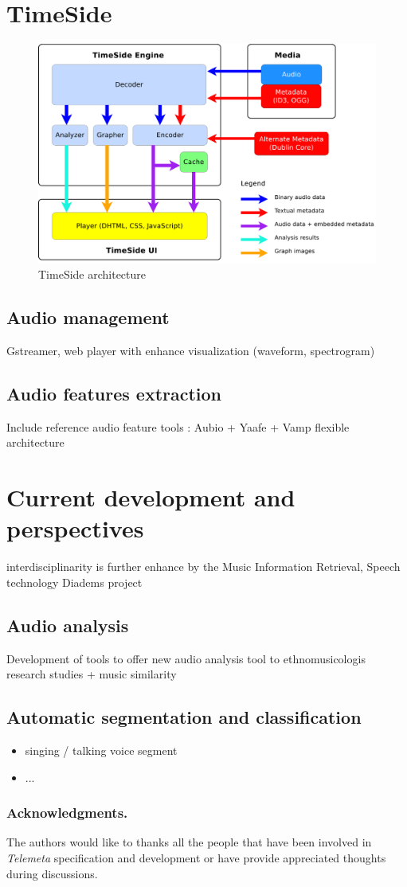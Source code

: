 \documentclass[runningheads,a4paper]{llncs}
\begin{document}
\section{TimeSide}

\begin{figure}[htbp]
  \centering
  \includegraphics[width=12cm]{img/timeside_schema.pdf}
  \caption{TimeSide architecture}
\end{figure}
\subsection{Audio management}
Gstreamer, web player
with enhance visualization (waveform, spectrogram)
\subsection{Audio features extraction}
Include reference audio feature tools : Aubio + Yaafe + Vamp
\cite{yaafe_ISMIR2010,brossierPhD}
flexible architecture 

\section{Current development and perspectives}
interdisciplinarity is further enhance by the Music Information Retrieval, Speech technology 
Diadems project
\subsection{Audio analysis}
Development of tools  to offer new audio analysis tool to ethnomusicologis research studies 
+ music similarity

\subsection{Automatic segmentation and classification}
\begin{itemize}
\item singing / talking voice segment
\item ...
\end{itemize}


\subsubsection*{Acknowledgments.} 
The authors would like to thanks all the people that have been involved in \emph{Telemeta} specification and development or have provide appreciated thoughts during discussions.





\end{document}
